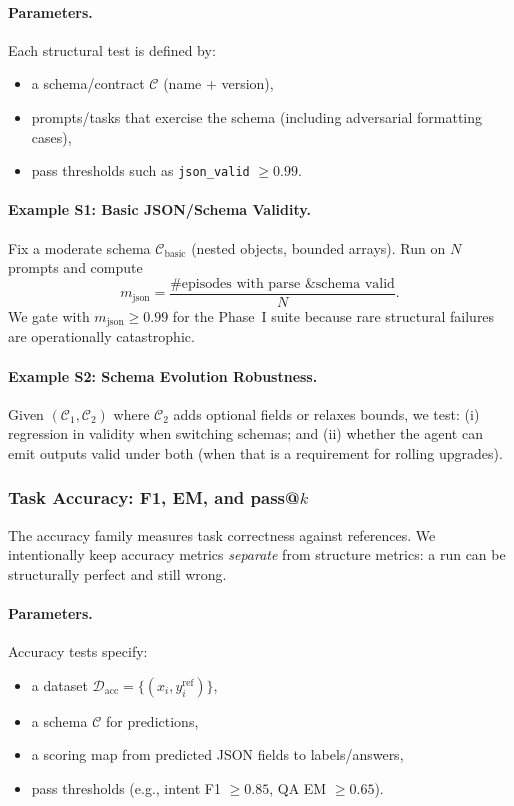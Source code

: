 \documentclass[11pt]{article}
\begin{document}
\paragraph{Parameters.}
Each structural test is defined by:
\begin{itemize}[leftmargin=12pt]
    \item a schema/contract $\mathcal{C}$ (name + version),
    \item prompts/tasks that exercise the schema (including adversarial formatting cases),
    \item pass thresholds such as \texttt{json\_valid} $\ge 0.99$.
\end{itemize}

\paragraph{Example S1: Basic JSON/Schema Validity.}
Fix a moderate schema $\mathcal{C}_{\text{basic}}$ (nested objects, bounded arrays).
Run on $N$ prompts and compute
\[
m_{\text{json}} = \frac{\#\text{episodes with parse \& schema valid}}{N}.
\]
We gate with $m_{\text{json}} \ge 0.99$ for the Phase~I suite because rare structural failures are operationally catastrophic.

\paragraph{Example S2: Schema Evolution Robustness.}
Given $(\mathcal{C}_1,\mathcal{C}_2)$ where $\mathcal{C}_2$ adds optional fields or relaxes bounds, we test:
(i) regression in validity when switching schemas; and (ii) whether the agent can emit outputs valid under both (when that is a requirement for rolling upgrades).

\subsubsection{Task Accuracy: F1, EM, and pass@\texorpdfstring{$k$}{k}}

The accuracy family measures task correctness against references.
We intentionally keep accuracy metrics \emph{separate} from structure metrics: a run can be structurally perfect and still wrong.

\paragraph{Parameters.}
Accuracy tests specify:
\begin{itemize}[leftmargin=12pt]
    \item a dataset $\mathcal{D}_{\text{acc}} = \{(x_i, y_i^{\text{ref}})\}$,
    \item a schema $\mathcal{C}$ for predictions,
    \item a scoring map from predicted JSON fields to labels/answers,
    \item pass thresholds (e.g., intent F1 $\ge 0.85$, QA EM $\ge 0.65$).
\end{itemize}
\end{document}
